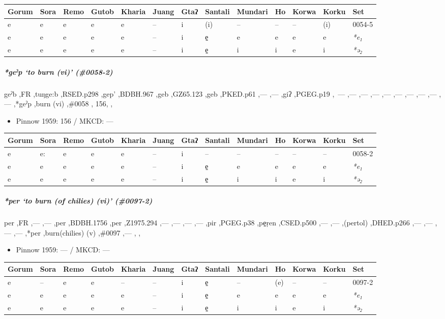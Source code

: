 \documentclass[a4paper,]{article}
\providecommand{\tightlist}{%
  \setlength{\itemsep}{0pt}\setlength{\parskip}{0pt}}
\let\oldsubparagraph\subparagraph
\renewcommand{\subparagraph}[1]{\oldsubparagraph{#1}\mbox{}}
\begin{document}
\begin{longtable}[]{@{}lllllllllllll@{}}
\toprule
Gorum & Sora & Remo & Gutob & Kharia & Juang & Gtaʔ & Santali & Mundari
& Ho & Korwa & Korku & Set\tabularnewline
\midrule
\endhead
e & e & e & e & e & -- & i & (i) & -- & -- & -- & (i) &
0054-5\tabularnewline
e & e & e & e & e & -- & i & e̠ & e & e & e & e &
\emph{*e₁}\tabularnewline
e & e & e & e & e & -- & i & e̠ & i & i & e & i &
\emph{*ə₂}\tabularnewline
\bottomrule
\end{longtable}

\subparagraph{\texorpdfstring{\emph{*geˀp} `to burn (vi)'
(\#0058-2)}{*geˀp to burn (vi) (\#0058-2)}}\label{geux2c0p-to-burn-vi-0058-2}

geˀb ,FR ,tuŋge:b ,RSED.p298 ,gep' ,BDBH.967 ,geb ,GZ65.123 ,geb
,PKED.p61 ,--- ,--- ,giʔ ,PGEG.p19 ,~--- ,--- ,--- ,--- ,--- ,--- ,---
,--- ,--- ,--- ,*geˀp ,burn (vi) ,\#0058 , 156, ,

\begin{itemize}
\tightlist
\item
  Pinnow 1959: 156 / MKCD: ---
\end{itemize}

\begin{longtable}[]{@{}lllllllllllll@{}}
\toprule
Gorum & Sora & Remo & Gutob & Kharia & Juang & Gtaʔ & Santali & Mundari
& Ho & Korwa & Korku & Set\tabularnewline
\midrule
\endhead
e & e: & e & e & e & -- & i & -- & -- & -- & -- & -- &
0058-2\tabularnewline
e & e & e & e & e & -- & i & e̠ & e & e & e & e &
\emph{*e₁}\tabularnewline
e & e & e & e & e & -- & i & e̠ & i & i & e & i &
\emph{*ə₂}\tabularnewline
\bottomrule
\end{longtable}

\subparagraph{\texorpdfstring{\emph{*per} `to burn (of chilies) (vi)'
(\#0097-2)}{*per to burn (of chilies) (vi) (\#0097-2)}}\label{per-to-burn-of-chilies-vi-0097-2}

per ,FR ,--- ,--- ,per ,BDBH.1756 ,per ,Z1975.294 ,--- ,--- ,--- ,---
,pir ,PGEG.p38 ,pe̠ṛen ,CSED.p500 ,--- ,--- ,(pertol) ,DHED.p266 ,---
,--- ,--- ,--- ,*per ,burn(chilies) (v) ,\#0097 ,--- , ,

\begin{itemize}
\tightlist
\item
  Pinnow 1959: --- / MKCD: ---
\end{itemize}

\begin{longtable}[]{@{}lllllllllllll@{}}
\toprule
Gorum & Sora & Remo & Gutob & Kharia & Juang & Gtaʔ & Santali & Mundari
& Ho & Korwa & Korku & Set\tabularnewline
\midrule
\endhead
e & -- & e & e & -- & -- & i & e̠ & -- & (e) & -- & -- &
0097-2\tabularnewline
e & e & e & e & e & -- & i & e̠ & e & e & e & e &
\emph{*e₁}\tabularnewline
e & e & e & e & e & -- & i & e̠ & i & i & e & i &
\emph{*ə₂}\tabularnewline
\bottomrule
\end{longtable}
\end{document}
